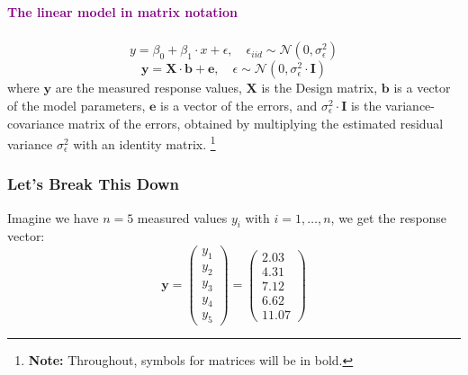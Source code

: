 \documentclass{beamer}
\begin{document}
\begin{frame}
    \frametitle{}
    \begin{center}
        \huge\textbf{\textcolor{purple}{The linear model in matrix notation}}
    \end{center}
\end{frame}

\begin{frame}
    \frametitle{}
    \begin{equation*}
        y = \beta_0 + \beta_1 \cdot x + \epsilon, \quad \epsilon_{iid} \sim \mathcal{N}(0, \sigma^2_{\epsilon})
    \end{equation*}
    \begin{equation*}
        \mathbf{y} = \mathbf{X} \cdot \mathbf{b} + \mathbf{e}, \quad \epsilon \sim \mathcal{N}(0, \sigma^2_{\epsilon} \cdot \mathbf{I})
    \end{equation*}
    where $\mathbf{y}$ are the measured response values, $\mathbf{X}$ is the Design matrix, $\mathbf{b}$ is a vector of the model parameters, $\mathbf{e}$ is a vector of the errors, and $\sigma^2_{\epsilon} \cdot \mathbf{I}$ is the variance-covariance matrix of the errors, obtained by multiplying the estimated residual variance $\sigma^2_{\epsilon}$ with an identity matrix. \footnote{\textbf{Note:} Throughout, symbols for matrices will be in bold.}
    

\end{frame}

\begin{frame}
    \frametitle{Let's Break This Down}
    Imagine we have $n = 5$ measured values $y_i$ with $i = 1, \ldots, n$, we get the response vector:
    \vspace{0.5cm}
    \begin{equation*}
        \mathbf{y} = \left( \begin{array}{c} y_1 \\ y_2 \\ y_3 \\ y_4 \\ y_5 \end{array}\right) = \left( \begin{array}{c} 2.03 \\ 4.31 \\ 7.12 \\ 6.62 \\ 11.07 \end{array}\right) 
    \end{equation*}    
\end{frame}
\end{document}
